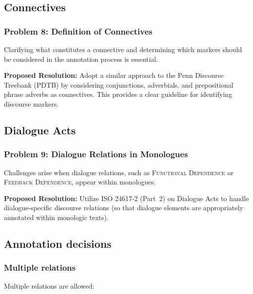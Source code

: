 \documentclass{udisc}
\begin{document}
\begin{itemize}
\subsection{Connectives}

\subsubsection{Problem 8: Definition of Connectives}

Clarifying what constitutes a connective and determining which markers should be considered in the annotation process is essential.

\textbf{Proposed Resolution:} Adopt a similar approach to the Penn Discourse Treebank (PDTB) by considering conjunctions, adverbials, and prepositional phrase adverbs as connectives. This provides a clear guideline for identifying discourse markers.

\subsection{Dialogue Acts}

\subsubsection{Problem 9: Dialogue Relations in Monologues}

Challenges arise when dialogue relations, such as \textsc{Functional Dependence} or \textsc{Feedback Dependence}, appear within monologues.

\textbf{Proposed Resolution:} Utilize ISO 24617-2 (Part~2) on Dialogue Acts to handle dialogue-specific discourse relations (so that dialogue elements are appropriately annotated within monologic texts).

\vspace{12pt}




\subsection{Annotation decisions}


\subsubsection{Multiple relations}

Multiple relations are allowed:


\end{itemize}
\end{document}
